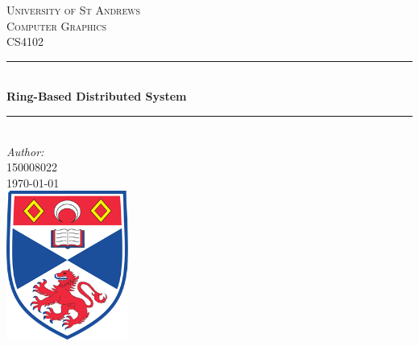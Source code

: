 \documentclass[12pt]{article}
\begin{document}
\begin{titlepage}

\newcommand{\HRule}{\rule{\linewidth}{0.5mm}} %

\center %
 

\textsc{\LARGE University of St Andrews}\\[1.5cm] %
\textsc{\Large Computer Graphics}\\[0.5cm] %
\textsc{\large CS4102}\\[0.5cm] %


\HRule \\[0.4cm]
{ \huge \bfseries Ring-Based Distributed System}\\[0.4cm] %
\HRule \\[1.5cm]
 


\Large \emph{Author:}\\
 \textsc{150008022}\\[1cm] %
 

{\large \today}\\[2cm] %


\includegraphics[width = 4cm]{images/standrewslogo.png}
 

\end{titlepage}
\end{document}

